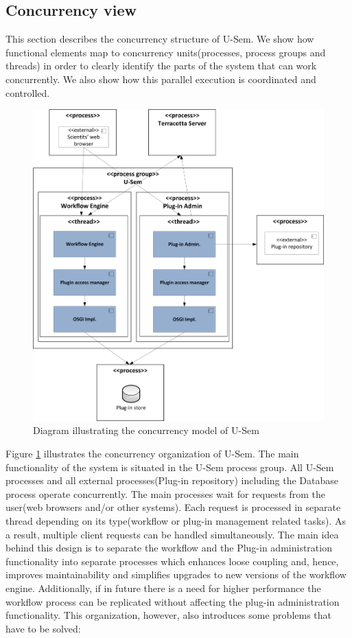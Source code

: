 \subsection{Concurrency view}

This section describes the concurrency structure of U-Sem. We show how functional elements map to concurrency units(processes, process groups and threads) in order to clearly identify the parts of the system that can work concurrently. We also show how this parallel execution is coordinated and controlled.

\begin{figure}[h!]
  \centering
  	\includegraphics[scale=0.70]{plug-in/layers/concur.png}
  \caption{Diagram illustrating the concurrency model of U-Sem}
  \label{fig_conc}
\end{figure}

Figure \ref{fig_conc} illustrates the concurrency organization of U-Sem. The main functionality of the system is situated in the U-Sem process group. All U-Sem processes and all external processes(Plug-in repository) including the Database process operate concurrently. The main processes wait for requests from the user(web browsers and/or other systems). Each request is processed in separate thread depending on its type(workflow or plug-in management related tasks). As a result, multiple client requests can be handled simultaneously. The main idea behind this design is to separate the workflow and the Plug-in administration functionality into separate processes which enhances loose coupling and, hence, improves maintainability and simplifies upgrades to new versions of the workflow engine. Additionally, if in future there is a need for higher performance the workflow process can be replicated without affecting the plug-in administration functionality. This organization, however, also introduces some problems that have to be solved:

